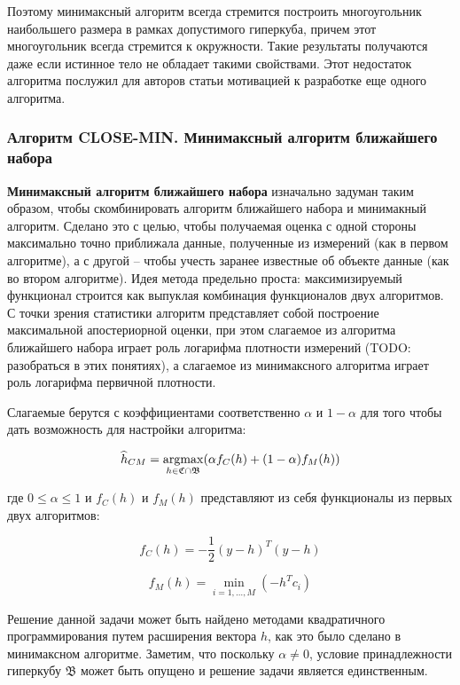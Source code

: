 \documentclass[a4paper, 12pt, titlepage]{article}
\theoremstyle{definition}
\theoremstyle{plain}
\theoremstyle{plain}
\begin{document}
Поэтому минимаксный алгоритм всегда стремится построить многоугольник
наибольшего размера в рамках допустимого гиперкуба, причем этот многоугольник
всегда стремится к окружности. Такие результаты получаются даже если истинное
тело не обладает такими свойствами. Этот недостаток алгоритма послужил для
авторов статьи мотивацией к разработке еще одного алгоритма.

\subsubsection{Алгоритм CLOSE-MIN. Минимаксный алгоритм ближайшего набора}
\label{sec:history/PrinceW90/algo-CLOSE-MIN}

\textbf{Минимаксный алгоритм ближайшего набора} изначально задуман таким
образом, чтобы скомбинировать алгоритм ближайшего набора и минимакный алгоритм.
Сделано это с целью, чтобы получаемая оценка с одной стороны максимально точно
приближала данные, полученные из измерений (как в первом алгоритме), а с другой
-- чтобы учесть заранее известные об объекте данные (как во втором алгоритме).
Идея метода предельно проста: максимизируемый функционал строится как выпуклая
комбинация функционалов двух алгоритмов. С точки зрения статистики алгоритм
представляет собой построение максимальной апостериорной оценки, при этом
слагаемое из алгоритма ближайшего набора играет роль логарифма плотности
измерений (TODO: разобраться в этих понятиях), а слагаемое из минимаксного
алгоритма играет роль логарифма первичной плотности.

Слагаемые берутся с коэффициентами соответственно $\alpha$ и $1 - \alpha$ для
того чтобы дать возможность для настройки алгоритма:

\begin{equation}
\widehat{h}_{CM} =
\operatornamewithlimits{argmax}_{h \in \mathfrak{C} \cap \mathfrak{B}}
(\alpha f_{C}(h) + (1 - \alpha) f_{M}(h))
\end{equation}

где $0 \leq \alpha \leq 1$ и $f_{C}(h)$ и $f_{M}(h)$ представляют из себя
функционалы из первых двух алгоритмов:

\begin{equation}
f_{C}(h) = - \frac{1}{2} (y - h)^{T} (y - h)
\end{equation}

\begin{equation}
f_{M}(h) = \min_{i = 1, \ldots, M} (- h^{T} c_{i})
\end{equation}

Решение данной задачи может быть найдено методами квадратичного
программирования путем расширения вектора $h$, как это было сделано в
минимаксном алгоритме. Заметим, что поскольку $\alpha \neq 0$, условие
принадлежности гиперкубу $\mathfrak{B}$ может быть опущено и решение задачи
является единственным.
\end{document}
